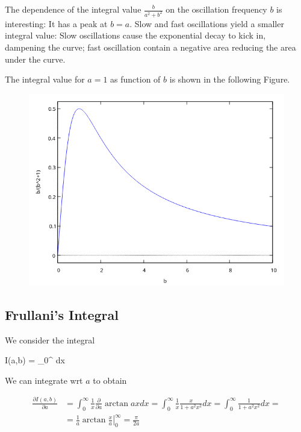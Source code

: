 The dependence of the integral value $\frac{b}{a^2 + b^2}$ on the oscillation frequency $b$ is interesting: It has a peak at $b = a$. Slow and fast oscillations yield a smaller integral value: Slow oscillations cause the exponential decay to kick in, dampening the curve; fast oscillation contain a negative area reducing the area under the curve.

The integral value for $a = 1$ as function of $b$ is shown in the following Figure.

\begin{figure}[H]
    \includegraphics[scale=0.7]{images/2022-04-05_plot_2.png}
\end{figure}


\subsection{Frullani's Integral}

We consider the integral

\bee
I(a,b) = \int_0^\infty {} dx
\eee

We can integrate wrt $a$ to obtain

\begin{align*}
  \frac{\partial I(a,b)}{\partial a} &= \int_0^\infty \frac{1}{x} \frac{\partial }{\partial a} \arctan ax dx = \int_0^\infty \frac{1}{x} \frac{x}{1+a^2 x^2} dx = \int_0^\infty \frac{1}{1+a^2 x^2} dx = \\
  &= \frac{1}{a} \left. \arctan \frac{x}{a} \right|_0^\infty = \frac{\pi}{2a}
\end{align*}


